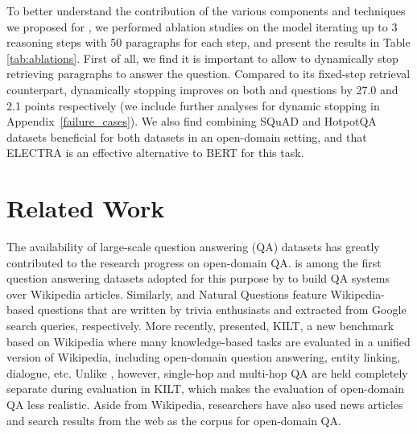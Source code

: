 To better understand the contribution of the various components and techniques we proposed for \irrr{}, we performed ablation studies on the model iterating up to 3 reasoning steps with 50 paragraphs for each step, and present the results in Table \ref{tab:ablations}. %
First of all, we find it is important to allow \irrr{} to dynamically stop retrieving paragraphs to answer the question.
Compared to its fixed-step retrieval counterpart, dynamically stopping \irrr{} improves \fone{} on both \squad{} and \hotpotqa{} questions by 27.0 and 2.1 points respectively (we include further analyses for dynamic stopping in Appendix~\ref{failure_cases}). 
We also find combining SQuAD and HotpotQA datasets beneficial for both datasets in an open-domain setting, and that ELECTRA is an effective alternative to BERT for this task. 

\section{Related Work}

The availability of large-scale question answering (QA) datasets has greatly contributed to the research progress on open-domain QA.
\squad{} \citep{rajpurkar2016squad, rajpurkar2018know} is among the first question answering datasets adopted for this purpose by \citet{chen2017reading} to build QA systems over Wikipedia articles.
Similarly, \triviaqa{} \citep{joshi-etal-2017-triviaqa} and Natural Questions \citep{kwiatkowski-etal-2019-natural} feature Wikipedia-based questions that are written by trivia enthusiasts and extracted from Google search queries, respectively.
More recently, \citet{petroni-etal-2021-kilt} presented, KILT, a new benchmark based on Wikipedia where many knowledge-based tasks are evaluated in a unified version of Wikipedia, including open-domain question answering, entity linking, dialogue, etc.
Unlike \beerqa{}, however, single-hop and multi-hop QA are held completely separate during evaluation in KILT, which makes the evaluation of open-domain QA less realistic.
Aside from Wikipedia, researchers have also used news articles \citep{trischler2016newsqa} and search results from the web \citep{dunn2017searchqa, talmor2018web} as the corpus for open-domain QA.

